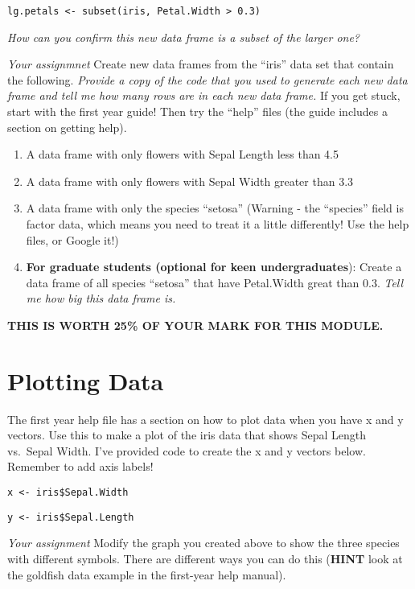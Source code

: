 \documentclass[]{book}
\begin{document}
\texttt{lg.petals\ \textless{}-\ subset(iris,\ Petal.Width\ \textgreater{}\ 0.3)}

\emph{How can you confirm this new data frame is a subset of the larger
one?}

\emph{Your assignmnet} Create new data frames from the ``iris'' data set
that contain the following. \emph{Provide a copy of the code that you
used to generate each new data frame and tell me how many rows are in
each new data frame.} If you get stuck, start with the first year guide!
Then try the ``help'' files (the guide includes a section on getting
help).

\begin{enumerate}
\def\labelenumi{\arabic{enumi}.}
\item
  A data frame with only flowers with Sepal Length less than 4.5
\item
  A data frame with only flowers with Sepal Width greater than 3.3
\item
  A data frame with only the species ``setosa'' (Warning - the
  ``species'' field is factor data, which means you need to treat it a
  little differently! Use the help files, or Google it!)
\item
  \textbf{For graduate students (optional for keen undergraduates}):
  Create a data frame of all species ``setosa'' that have Petal.Width
  great than 0.3. \emph{Tell me how big this data frame is.}
\end{enumerate}

\textbf{THIS IS WORTH 25\% OF YOUR MARK FOR THIS MODULE.}

\chapter{Plotting Data}\label{plotting-data}

The first year help file has a section on how to plot data when you have
x and y vectors. Use this to make a plot of the iris data that shows
Sepal Length vs.~Sepal Width. I've provided code to create the x and y
vectors below. Remember to add axis labels!

\texttt{x\ \textless{}-\ iris\$Sepal.Width}

\texttt{y\ \textless{}-\ iris\$Sepal.Length}

\emph{Your assignment} Modify the graph you created above to show the
three species with different symbols. There are different ways you can
do this (\textbf{HINT} look at the goldfish data example in the
first-year help manual).
\end{document}
